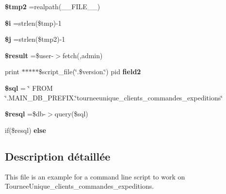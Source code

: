 \begin{DoxyCompactItemize}
\item 
\mbox{\label{tourneeunique__clients__commandes__expeditions_8php_aed9bcb6730d1510376ce80e32bd9504d}} 
{\bfseries \$tmp2} =realpath(\+\_\+\+\_\+\+F\+I\+L\+E\+\_\+\+\_\+)
\item 
\mbox{\label{tourneeunique__clients__commandes__expeditions_8php_a83018d9153d17d91fbcf3bc10158d34f}} 
{\bfseries \$i} =strlen(\$tmp)-\/1
\item 
\mbox{\label{tourneeunique__clients__commandes__expeditions_8php_a6f16db779ef3ccea921b277b5dc245d1}} 
{\bfseries \$j} =strlen(\$tmp2)-\/1
\item 
\mbox{\label{tourneeunique__clients__commandes__expeditions_8php_a112ef069ddc0454086e3d1e6d8d55d07}} 
{\bfseries \$result} =\$user-\/$>$fetch(\textquotesingle{}\textquotesingle{},\textquotesingle{}admin\textquotesingle{})
\item 
\mbox{\label{tourneeunique__clients__commandes__expeditions_8php_af9edfce80596a171cfb2884ba7ad01df}} 
print $\ast$$\ast$$\ast$$\ast$$\ast$\$script\+\_\+file(\char`\"{}.\$version.\char`\"{}) pid {\bfseries field2}
\item 
\mbox{\label{tourneeunique__clients__commandes__expeditions_8php_a047170d6020a882807665812a27e2525}} 
{\bfseries \$sql} = \char`\"{} F\+R\+OM \char`\"{}.M\+A\+I\+N\+\_\+\+D\+B\+\_\+\+P\+R\+E\+F\+I\+X.\char`\"{}tourneeunique\+\_\+clients\+\_\+commandes\+\_\+expeditions\char`\"{}
\item 
\mbox{\label{tourneeunique__clients__commandes__expeditions_8php_a6adc5ef389ab51c21dee69262018d615}} 
{\bfseries \$resql} =\$db-\/$>$query(\$sql)
\item 
if(\$resql) {\bfseries else}
\end{DoxyCompactItemize}


\subsection{Description détaillée}
This file is an example for a command line script to work on Tournee\+Unique\+\_\+clients\+\_\+commandes\+\_\+expeditions. 



